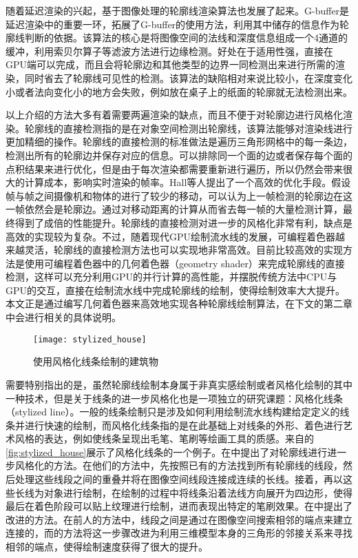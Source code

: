 随着延迟渲染的兴起，基于图像处理的轮廓线渲染算法也发展了起来。G-buffer是延迟渲染中的重要一环，\citeauthor{decaudin1996cartoon}\cite{decaudin1996cartoon}拓展了G-buffer的使用方法，利用其中储存的信息作为轮廓线判断的依据。该算法的核心是将图像空间的法线和深度信息组成一个4通道的缓冲，利用索贝尔算子\cite{gao2010improved}等滤波方法进行边缘检测。好处在于适用性强，直接在GPU端可以完成，而且会将轮廓边和其他类型的边界一同检测出来进行所需的渲染，同时省去了轮廓线可见性的检测。该算法的缺陷相对来说比较小，在深度变化小或者法向变化小的地方会失败，例如放在桌子上的纸面的轮廓就无法检测出来。

以上介绍的方法大多有着需要两遍渲染的缺点，而且不便于对轮廓边进行风格化渲染。轮廓线的直接检测指的是在对象空间检测出轮廓线，该算法能够对渲染线进行更加精细的操作。轮廓线的直接检测的标准做法是遍历三角形网格中的每一条边，检测出所有的轮廓边并保存对应的信息\cite{marshall2001cartoon}。可以排除同一个面的边或者保存每个面的点积结果来进行优化，但是由于每次渲染都需要重新进行遍历，所以仍然会带来很大的计算成本，影响实时渲染的帧率。Hall等人提出了一个高效的优化手段\cite{decaudin1996cartoon}。假设帧与帧之间摄像机和物体的进行了较少的移动，可以认为上一帧检测的轮廓边在这一帧依然会是轮廓边。通过对移动距离的计算从而省去每一帧的大量检测计算，最终得到了成倍的性能提升。轮廓线的直接检测对进一步的风格化非常有利，缺点是高效的实现较为复杂。不过，随着现代GPU绘制流水线的发展，可编程着色器越来越灵活，轮廓线的直接检测方法也可以实现地非常高效。目前比较高效的实现方法是使用可编程着色器中的几何着色器（geometry shader）来完成轮廓线的直接检测，这样可以充分利用GPU的并行计算的高性能，并摆脱传统方法中CPU与GPU的交互，直接在绘制流水线中完成轮廓线的绘制，使得绘制效率大大提升。本文正是通过编写几何着色器来高效地实现各种轮廓线绘制算法，在下文的第二章中会进行相关的具体说明。

\begin{figure}[tbh]
    \centering
    \texttt{[image: stylized\_house]}
    \caption{\label{fig:stylized_house}
    使用风格化线条绘制的建筑物}
\end{figure}

需要特别指出的是，虽然轮廓线绘制本身属于非真实感绘制或者风格化绘制的其中一种技术，但是关于线条的进一步风格化也是一项独立的研究课题：风格化线条（stylized line）。一般的线条绘制只是涉及如何利用绘制流水线构建给定定义的线条并进行快速的绘制，而风格化线条指的是在此基础上对线条的外形、着色进行艺术风格的表达，例如使线条呈现出毛笔、笔刷等绘画工具的质感。来自\cite{northrup2000artistic}的\autoref{fig:stylized_house}展示了风格化线条的一个例子。\citeauthor{northrup2000artistic}在\cite{northrup2000artistic}中提出了对轮廓线进行进一步风格化的方法。在他们的方法中，先按照已有的方法找到所有轮廓线的线段，然后处理这些线段之间的重叠并将在图像空间线段连接成连续的长线。接着，再以这些长线为对象进行绘制，在绘制的过程中将线条沿着法线方向展开为四边形，使得最后在着色阶段可以贴上纹理进行绘制，进而表现出特定的笔刷效果。\citeauthor{isenberg2002stylizing}在\cite{isenberg2002stylizing}中提出了改进的方法。在前人的方法中，线段之间是通过在图像空间搜索相邻的端点来建立连接的，而\citeauthor{isenberg2002stylizing}的方法将这一步骤改进为利用三维模型本身的三角形的邻接关系来寻找相邻的端点，使得绘制速度获得了很大的提升。

